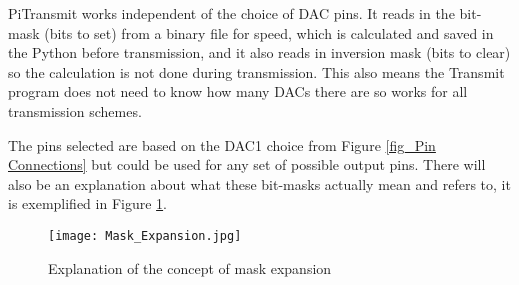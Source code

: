 \documentclass[../main.tex]{subfiles}
\begin{document}
PiTransmit works independent of the choice of DAC pins.
It reads in the bit-mask (bits to set) from a binary file for speed, which is calculated and saved in the Python before transmission, and it also reads in inversion mask (bits to clear) so the calculation is not done during transmission.
This also means the Transmit program does not need to know how many DACs there are so works for all transmission schemes.

The pins selected are based on the DAC1 choice from Figure \ref{fig_Pin Connections} but could be used for any set of possible output pins.
There will also be an explanation about what these bit-masks actually mean and refers to, it is exemplified in Figure \ref{fig_Mask Expansion}.

\begin{figure}[ht]
	\centering
	\texttt{[image: Mask\_Expansion.jpg]}
	\caption{Explanation of the concept of mask expansion}
	\label{fig_Mask Expansion}
\end{figure}
\end{document}
